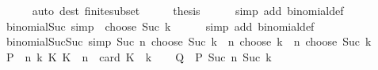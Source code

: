 \begin{isabellebody}
\ \ \ \ \isamarkupfalse%
\ {\isacharparenleft}{\kern0pt}auto\ dest{\isacharcolon}{\kern0pt}\ finite{\isacharunderscore}{\kern0pt}subset{\isacharparenright}{\kern0pt}\isanewline
\ \ \isamarkupfalse%
\ \isamarkupfalse%
\ {\isacharquery}{\kern0pt}thesis\isanewline
\ \ \ \ \isamarkupfalse%
\ {\isacharparenleft}{\kern0pt}simp\ add{\isacharcolon}{\kern0pt}\ binomial{\isacharunderscore}{\kern0pt}def{\isacharparenright}{\kern0pt}\isanewline
{}\isamarkupfalse%
%
\endisatagproof
{\isafoldproof}%
%
\isadelimproof
\isanewline
%
\endisadelimproof
\isanewline
{}\isamarkupfalse%
\ binomial{\isacharunderscore}{\kern0pt}{}{\isacharunderscore}{\kern0pt}Suc\ {\isacharbrackleft}{\kern0pt}simp{\isacharbrackright}{\kern0pt}{\isacharcolon}{\kern0pt}\ {\isachardoublequoteopen}{}\ choose\ Suc\ k\ {\isacharequal}{\kern0pt}\ {}{\isachardoublequoteclose}\isanewline
%
\isadelimproof
\ \ %
\endisadelimproof
%
\isatagproof
{}\isamarkupfalse%
\ {\isacharparenleft}{\kern0pt}simp\ add{\isacharcolon}{\kern0pt}\ binomial{\isacharunderscore}{\kern0pt}def{\isacharparenright}{\kern0pt}%
\endisatagproof
{\isafoldproof}%
%
\isadelimproof
\isanewline
%
\endisadelimproof
\isanewline
{}\isamarkupfalse%
\ binomial{\isacharunderscore}{\kern0pt}Suc{\isacharunderscore}{\kern0pt}Suc\ {\isacharbrackleft}{\kern0pt}simp{\isacharbrackright}{\kern0pt}{\isacharcolon}{\kern0pt}\ {\isachardoublequoteopen}Suc\ n\ choose\ Suc\ k\ {\isacharequal}{\kern0pt}\ {\isacharparenleft}{\kern0pt}n\ choose\ k{\isacharparenright}{\kern0pt}\ {\isacharplus}{\kern0pt}\ {\isacharparenleft}{\kern0pt}n\ choose\ Suc\ k{\isacharparenright}{\kern0pt}{\isachardoublequoteclose}\isanewline
%
\isadelimproof
%
\endisadelimproof
%
\isatagproof
{}\isamarkupfalse%
\ {\isacharminus}{\kern0pt}\isanewline
\ \ \isamarkupfalse%
\ {\isacharquery}{\kern0pt}P\ {\isacharequal}{\kern0pt}\ {\isachardoublequoteopen}{\isasymlambda}n\ k{\isachardot}{\kern0pt}\ {\isacharbraceleft}{\kern0pt}K{\isachardot}{\kern0pt}\ K\ {\isasymsubseteq}\ {\isacharbraceleft}{\kern0pt}{}{\isachardot}{\kern0pt}{\isachardot}{\kern0pt}{\isacharless}{\kern0pt}n{\isacharbraceright}{\kern0pt}\ {\isasymand}\ card\ K\ {\isacharequal}{\kern0pt}\ k{\isacharbraceright}{\kern0pt}{\isachardoublequoteclose}\isanewline
\ \ \isamarkupfalse%
\ {\isacharquery}{\kern0pt}Q\ {\isacharequal}{\kern0pt}\ {\isachardoublequoteopen}{\isacharquery}{\kern0pt}P\ {\isacharparenleft}{\kern0pt}Suc\ n{\isacharparenright}{\kern0pt}\ {\isacharparenleft}{\kern0pt}Suc\ k{\isacharparenright}{\kern0pt}{\isachardoublequoteclose}\isanewline

\end{isabellebody}
